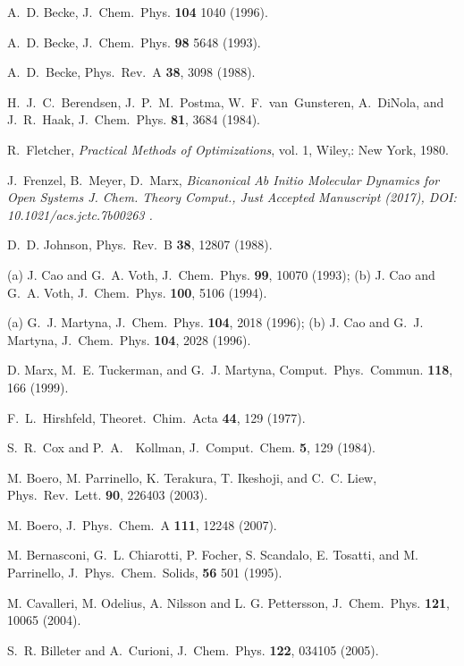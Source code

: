 \documentclass[twoside,10pt,titlepage,a4paper]{article}
\begin{document}
\begin{thebibliography}{999}
    A.~D. Becke, J.~Chem.~Phys. {\bf 104} 1040 (1996).

    A.~D. Becke, J.~Chem.~Phys. {\bf 98} 5648 (1993).

    A.~D.~Becke,
    Phys.~Rev.~A {\bf 38}, 3098 (1988).

    H.~J.~C.~Berendsen, J.~P.~M.~Postma, W.~F.~van~Gunsteren, 
    A.~DiNola, and J.~R.~Haak,
    J.~Chem.~Phys. {\bf 81}, 3684 (1984).

    R.~Fletcher,
    {\em Practical Methods of Optimizations}, vol. 1, 
    Wiley,: New York, 1980.

    J.~Frenzel, B.~Meyer, D.~Marx, 
    \em{Bicanonical Ab Initio Molecular Dynamics for Open Systems}
    J. Chem. Theory Comput., Just Accepted Manuscript 
    (2017), 
    DOI: 10.1021/acs.jctc.7b00263 .

    D.~D. Johnson, Phys.~Rev.~B {\bf 38}, 12807 (1988).

  (a) J. Cao and G.~A. Voth,
    J.~Chem.~Phys. {\bf 99}, 10070 (1993);
  (b) J. Cao and G.~A. Voth,
    J.~Chem.~Phys. {\bf 100}, 5106 (1994).

  (a) G.~J. Martyna,
    J.~Chem.~Phys. {\bf 104}, 2018 (1996);
  (b) J. Cao and G.~J. Martyna,
    J.~Chem.~Phys. {\bf 104}, 2028 (1996).

    D. Marx, M.~E. Tuckerman, and G.~J. Martyna,
    Comput.~Phys.~Commun. {\bf 118}, 166 (1999).

    F.~L.~Hirshfeld,
    Theoret.~Chim.~Acta {\bf 44}, 129 (1977).

    S.~R.~Cox and P.~A.~~Kollman,
    J.~Comput.~Chem. {\bf 5}, 129 (1984).

 M. Boero, M. Parrinello, K. Terakura, T. Ikeshoji, and C.~C. Liew,
     Phys.~Rev.~Lett. {\bf 90}, 226403 (2003).

 M. Boero, J.~Phys.~Chem.~A {\bf 111}, 12248 (2007).

    M. Bernasconi, G.~L. Chiarotti, P. Focher, S. Scandalo, E. Tosatti,
    and M. Parrinello, J.~Phys.~Chem.~Solids, {\bf 56} 501 (1995).

 M. Cavalleri, M. Odelius, A. Nilsson and L. G. Pettersson,
     J.~Chem.~Phys. {\bf 121}, 10065 (2004).

    S.~R. Billeter and A.~Curioni,
    J.~Chem.~Phys. {\bf 122}, 034105 (2005).


\end{thebibliography}
\end{document}
